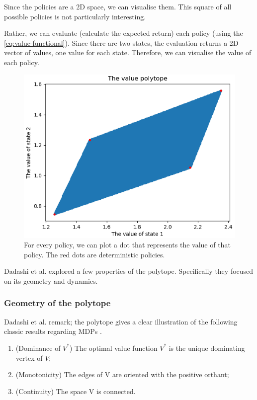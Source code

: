 Since the policies are a 2D space, we can visualise them. This square of all possible policies is not particularly interesting.

Rather, we can evaluate (calculate the expected return) each policy (using the \eqref{eq:value-functional}).
Since there are two states, the evaluation returns a 2D vector of values, one value for each state.
Therefore, we can visualise the value of each policy.
\begin{figure}[!hb]
\centering
\includegraphics[width=1\textwidth,height=0.5\textheight]{../../pictures/figures/value-polytope.png}
\caption{For every policy, we can plot a dot that represents the value of that policy.
The red dots are deterministic policies.}
\end{figure}

Dadashi et al. \cite{Dadashi2018} explored a few properties of the polytope.
Specifically they focused on its geometry and dynamics.

\subsubsection{Geometry of the polytope}\label{geom-polytope}

Dadashi et al. remark; the polytope gives a clear illustration of the following classic results regarding MDPs \cite{Bertsekas1996}.

\begin{enumerate}
\tightlist
  \item (Dominance of $V^*$) The optimal value function $V^*$ is the unique dominating vertex of $V$;
  \item (Monotonicity) The edges of V are oriented with the positive orthant;
  \item (Continuity) The space V is connected.
\end{enumerate}

